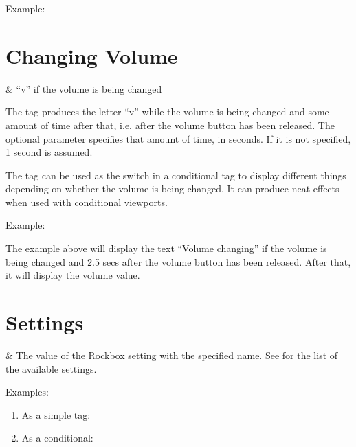 Example: 

\section{Changing Volume}
\begin{table}
  \begin{tagmap}{}{}
     & ``v'' if the volume is being changed\\
  \end{tagmap}
\end{table}

The tag produces the letter ``v'' while the volume is being changed and some
amount of time after that, i.e. after the volume button has been released. The
optional parameter  specifies that amount of time, in seconds. If it
is not specified, 1 second is assumed.

The tag can be used as the switch in a conditional tag to display different things
depending on whether the volume is being changed. It can produce neat effects
when used with conditional viewports.

Example: 

The example above will display the text ``Volume changing'' if the volume is
being changed and 2.5 secs after the volume button has been released. After
that, it will display the volume value.

\section{Settings}
\begin{table}
  \begin{tagmap}{}{}
     & The value of the Rockbox
             setting with the specified name. See 
             for the list of the available settings.\\
  \end{tagmap}
\end{table}

Examples:
\begin{enumerate}
\item As a simple tag: 
\item As a conditional: 
\end{enumerate}


